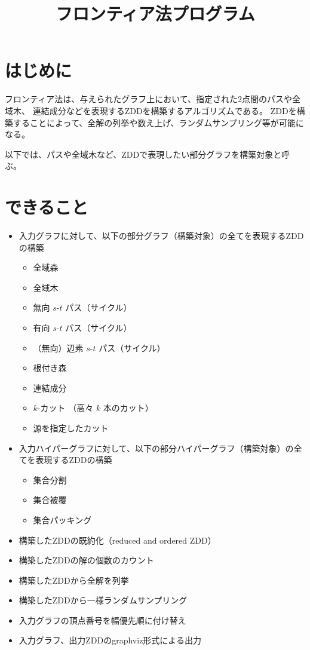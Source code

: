 \documentclass{jsarticle}
\title{フロンティア法プログラム}
\begin{document}
\maketitle

\section{はじめに}

フロンティア法は、与えられたグラフ上において、指定された2点間のパスや全域木、
連結成分などを表現するZDDを構築するアルゴリズムである。
ZDDを構築することによって、全解の列挙や数え上げ、ランダムサンプリング等が可能になる。

以下では、パスや全域木など、ZDDで表現したい部分グラフを構築対象と呼ぶ。

\section{できること}

\begin{itemize}
\item 入力グラフに対して、以下の部分グラフ（構築対象）の全てを表現するZDDの構築
\begin{itemize}
\item 全域森
\item 全域木
\item 無向 $s$-$t$ パス（サイクル）
\item 有向 $s$-$t$ パス（サイクル）
\item （無向）辺素 $s$-$t$ パス（サイクル）
\item 根付き森
\item 連結成分
\item $k$-カット （高々 $k$ 本のカット）
\item 源を指定したカット
\end{itemize}
\item 入力ハイパーグラフに対して、以下の部分ハイパーグラフ（構築対象）の全てを表現するZDDの構築
\begin{itemize}
\item 集合分割
\item 集合被覆
\item 集合パッキング
\end{itemize}
\item 構築したZDDの既約化（reduced and ordered ZDD）
\item 構築したZDDの解の個数のカウント
\item 構築したZDDから全解を列挙
\item 構築したZDDから一様ランダムサンプリング
\item 入力グラフの頂点番号を幅優先順に付け替え
\item 入力グラフ、出力ZDDのgraphviz形式による出力
\end{itemize}
\end{document}
